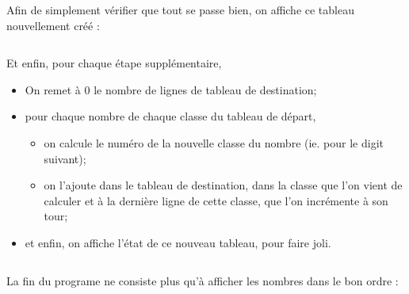 \documentclass[10pt]{article}
\begin{document}
  \inputminted[linenos,firstnumber=19,firstline=19,lastline=25]{cpp}{../src/main.cpp}

  Afin de simplement vérifier que tout se passe bien, on affiche ce tableau nouvellement créé :

  \inputminted[linenos,firstnumber=28,firstline=28,lastline=34]{cpp}{../src/main.cpp}

  Et enfin, pour chaque étape supplémentaire,
  \begin{itemize}
   \item On remet à 0 le nombre de lignes de tableau de destination;
   \item pour chaque nombre de chaque classe du tableau de départ,
    \begin{itemize}
     \item on calcule le numéro de la nouvelle classe du nombre (ie. pour le digit suivant);
     \item on l'ajoute dans le tableau de destination, dans la classe que l'on vient de calculer et à la dernière ligne de cette classe, que l'on incrémente à son tour;
    \end{itemize}
   \item et enfin, on affiche l'état de ce nouveau tableau, pour faire joli.
  \end{itemize}

  \inputminted[linenos,firstnumber=40,firstline=40,lastline=57]{cpp}{../src/main.cpp}

  La fin du programe ne consiste plus qu'à afficher les nombres dans le bon ordre :

  \inputminted[linenos,firstnumber=60,firstline=60,lastline=66]{cpp}{../src/main.cpp}
\end{document}
